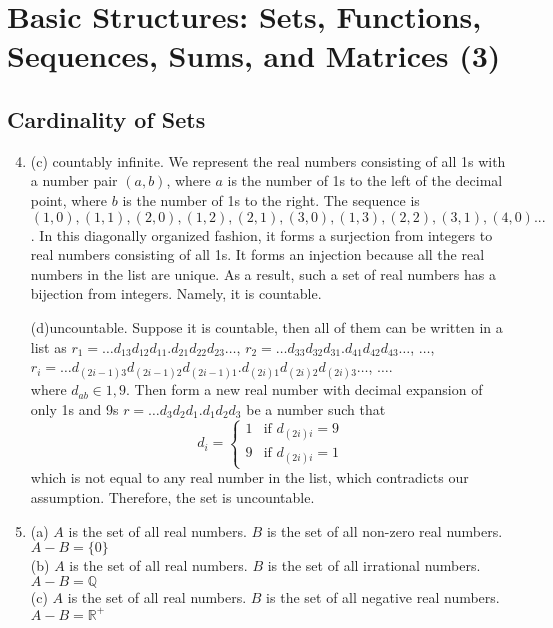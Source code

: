 \documentclass{article}
\begin{document}
\setlength{\parskip}{7pt}

\setcounter{section}{1}
\section{Basic Structures: Sets, Functions, Sequences, Sums, and Matrices (3)}
\setcounter{subsection}{4}
\subsection{Cardinality of Sets}

\begin{enumerate}
    \setcounter{enumi}{3}
    \item (c) countably infinite. We represent the real numbers consisting of all 1s with a number pair $(a,b)$, where $a$ is the number of 1s to the left of the decimal point, where $b$ is the number of 1s to the right. The sequence is $(1,0), (1,1), (2,0), (1,2), (2,1), (3,0), (1,3), (2,2), (3,1), (4,0)...$. In this diagonally organized fashion, it forms a surjection from integers to real numbers consisting of all 1s. It forms an injection because all the real numbers in the list are unique. As a result, such a set of real numbers has a bijection from integers. Namely, it is countable.
    
    (d)uncountable. Suppose it is countable, then all of them can be written in a list as $r_1 =  \dots   d_{13}d_{12}d_{11}.d_{21}d_{22}d_{23} \dots $, $r_2 = \dots d_{33}d_{32}d_{31}.d_{41}d_{42}d_{43} \dots$, $\dots$,\\ 
    $r_i = \dots d_{(2i-1)3}d_{(2i-1)2}d_{(2i-1)1}.d_{(2i)1}d_{(2i)2}d_{(2i)3} \dots$, $\dots$.\\
    where $d_{ab} \in {1,9}$. Then form a new real number with decimal expansion of only 1s and 9s $r = \dots d_3d_2d_1.d_1d_2d_3$ be a number such that 
    \[d_i =  \begin{cases}
        1 & \text{if } d_{(2i)i} = 9\\
        9 & \text{if } d_{(2i)i} = 1
    \end{cases}
    \] which is not equal to any real number in the list, which contradicts our assumption. Therefore, the set is uncountable.
    
    \setcounter{enumi}{9}
    \item  (a) $A$ is the set of all real numbers. $B$ is the set of all non-zero real numbers. $A-B = \{0\}$\\
    (b) $A$ is the set of all real numbers. $B$ is the set of all irrational numbers. $A-B = \mathbb{Q}$\\
    (c) $A$ is the set of all real numbers. $B$ is the set of all negative real numbers. $A-B = \mathbb{R^+}$
    

\end{enumerate}
\end{document}

